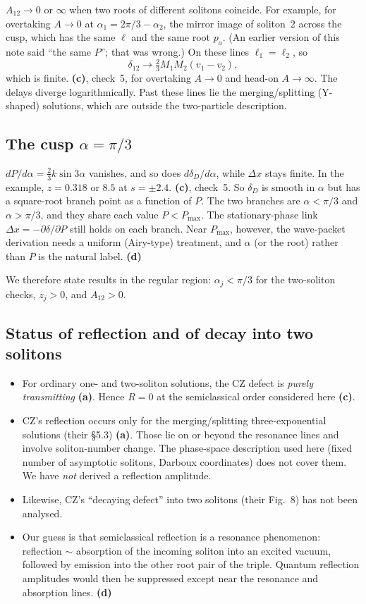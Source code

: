\documentclass[11pt,a4paper]{article}
\newcommand{\La}{\textsf{\textbf{(a)}}}\newcommand{\Lb}{\textsf{\textbf{(b)}}}
\newcommand{\Lc}{\textsf{\textbf{(c)}}}\newcommand{\Ld}{\textsf{\textbf{(d)}}}
\begin{document}
$A_{12}\to0$ or $\infty$ when two roots of different solitons coincide. For example, for overtaking $A\to0$ at $\alpha_1=2\pi/3-\alpha_2$, the mirror image of soliton~2 across the cusp, which has the same $\ell$ and the same root $p_a$. (An earlier version of this note said ``the same $P$''; that was wrong.) On these lines $\ell_1=\ell_2$, so
\[
\delta_{12}\to\tfrac23M_1M_2(v_1-v_2),
\]
which is finite. \Lc, check~5, for overtaking $A\to0$ and head-on $A\to\infty$. The delays diverge logarithmically. Past these lines lie the merging/splitting (Y-shaped) solutions, which are outside the two-particle description.

\subsection{The cusp $\alpha=\pi/3$}

$dP/d\alpha=\tfrac23k\sin3\alpha$ vanishes, and so does $d\delta_D/d\alpha$, while $\Delta x$ stays finite. In the example, $z=0.318$ or $8.5$ at $s=\pm2.4$. \Lc, check~5. So $\delta_D$ is smooth in $\alpha$ but has a square-root branch point as a function of $P$. The two branches are $\alpha<\pi/3$ and $\alpha>\pi/3$, and they share each value $P<P_{\max}$. The stationary-phase link $\Delta x=-\partial\delta/\partial P$ still holds on each branch. Near $P_{\max}$, however, the wave-packet derivation needs a uniform (Airy-type) treatment, and $\alpha$ (or the root) rather than $P$ is the natural label. \Ld

We therefore state results in the regular region: $\alpha_j<\pi/3$ for the two-soliton checks, $z_j>0$, and $A_{12}>0$.

\subsection{Status of reflection and of decay into two solitons}

\begin{itemize}
\item For ordinary one- and two-soliton solutions, the CZ defect is \emph{purely transmitting} \La. Hence $R=0$ at the semiclassical order considered here \Lc.
\item CZ's reflection occurs only for the merging/splitting three-exponential solutions (their \S5.3) \La. Those lie on or beyond the resonance lines and involve soliton-number change. The phase-space description used here (fixed number of asymptotic solitons, Darboux coordinates) does not cover them. We have \emph{not} derived a reflection amplitude.
\item Likewise, CZ's ``decaying defect'' into two solitons (their Fig.~8) has not been analysed.
\item Our guess is that semiclassical reflection is a resonance phenomenon: reflection $\sim$ absorption of the incoming soliton into an excited vacuum, followed by emission into the other root pair of the triple. Quantum reflection amplitudes would then be suppressed except near the resonance and absorption lines. \Ld
\end{itemize}
\end{document}
